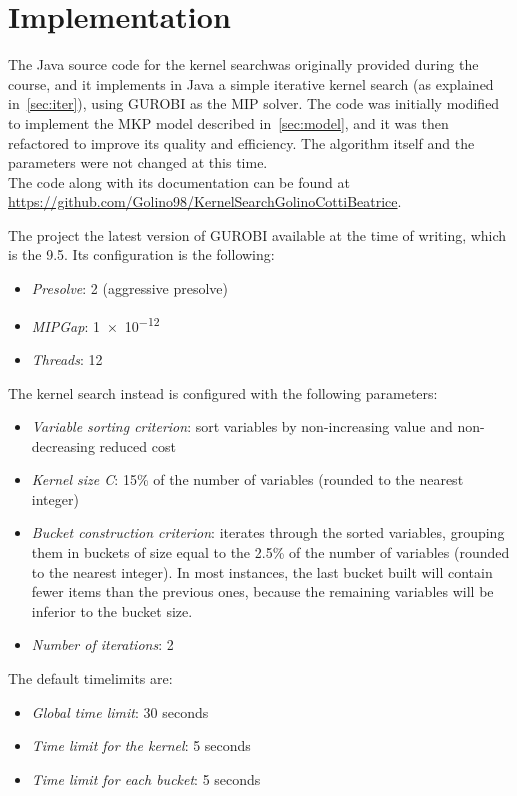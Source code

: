 \chapter{Implementation}

The Java source code for the kernel searchwas originally provided during the course,
and it implements in Java a simple iterative kernel search (as explained in~\ref{sec:iter}),
using GUROBI as the MIP solver.
The code was initially modified to implement the MKP model described in~\ref{sec:model},
and it was then refactored to improve its quality and efficiency.
The algorithm itself and the parameters were not changed at this time.\\

The code along with its documentation can be found at
\url{https://github.com/Golino98/KernelSearchGolinoCottiBeatrice}.


The project the latest version of GUROBI available at the time of writing, which is the 9.5.
Its configuration is the following:
\begin{itemize}
    \item \textit{Presolve}: 2 (aggressive presolve)
    \item \textit{MIPGap}: \num{1e-12}
    \item \textit{Threads}: 12
\end{itemize}

The kernel search instead is configured with the following parameters:
\begin{itemize}
    \item \textit{Variable sorting criterion}: sort variables by non-increasing value and non-decreasing reduced cost
    \item \textit{Kernel size C}: 15\% of the number of variables (rounded to the nearest integer)
    \item \textit{Bucket construction criterion}: iterates through the sorted variables, grouping them in
    buckets of size equal to the 2.5\% of the number of variables (rounded to the nearest integer).
    In most instances, the last bucket built will contain fewer items than the previous ones, because the remaining
    variables will be inferior to the bucket size.
    \item \textit{Number of iterations}: 2
\end{itemize}

The default timelimits are:
\begin{itemize}
    \item \textit{Global time limit}: 30 seconds
    \item \textit{Time limit for the kernel}: 5 seconds
    \item \textit{Time limit for each bucket}: 5 seconds
\end{itemize}

